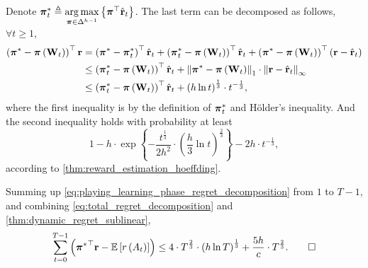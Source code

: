 Denote ${\boldsymbol{\pi}}_t^* \triangleq \operatorname*{arg\,max}\limits_{{\boldsymbol{\pi}} \in \Delta^{h-1}}{\left\{ {\boldsymbol{\pi}}^\top \hat{{\mathbf{r}}}_t\right\}}$. The last term can be decomposed as follows, $\forall t \ge 1$,
\begin{equation}
\label{eq:playing_learning_phase_regret_decomposition}
\begin{split}
    \left( {{\boldsymbol{\pi}}^*} - {\boldsymbol{\pi}}\left( {\mathbf{W}}_t \right) \right)^\top {\mathbf{r}} &= \left( {{\boldsymbol{\pi}}^*} - {{\boldsymbol{\pi}}_t^*} \right)^\top \hat{{\mathbf{r}}}_t + \left( {{\boldsymbol{\pi}}_t^*} - {\boldsymbol{\pi}}\left( {\mathbf{W}}_t \right) \right)^\top \hat{{\mathbf{r}}}_t + \left( {{\boldsymbol{\pi}}^*} - {\boldsymbol{\pi}}\left( {\mathbf{W}}_t \right) \right)^\top \left( {\mathbf{r}} - \hat{{\mathbf{r}}}_t \right) \\
    &\le \left( {{\boldsymbol{\pi}}_t^*} - {\boldsymbol{\pi}}\left( {\mathbf{W}}_t \right) \right)^\top \hat{{\mathbf{r}}}_t  + \left\| {\boldsymbol{\pi}}^* - {\boldsymbol{\pi}}\left( {\mathbf{W}}_t \right) \right\|_1 \cdot \left\| {\mathbf{r}} - \hat{{\mathbf{r}}}_t \right\|_\infty \\
    &\le \left( {{\boldsymbol{\pi}}_t^*} - {\boldsymbol{\pi}}\left( {\mathbf{W}}_t \right) \right)^\top \hat{{\mathbf{r}}}_t + \left( h \ln{t} \right)^\frac{1}{3}  \cdot t^{- \frac{1}{3}},
\end{split}
\end{equation}
where the first inequality is by the definition of ${\boldsymbol{\pi}}_t^*$ and  H{\"o}lder's inequality. And the second inequality holds with probability at least 
\begin{equation*}
    1 - h \cdot \exp\left\{ - \frac{t^{\frac{1}{3}}}{2 h^2} \cdot \left( \frac{h}{3} \ln{t} \right)^{\frac{2}{3}} \right\} - 2 h \cdot t^{- \frac{1}{3}},
\end{equation*}
according to \cref{thm:reward_estimation_hoeffding}. 

Summing up \cref{eq:playing_learning_phase_regret_decomposition} from $1$ to $T-1$, and
combining \cref{eq:total_regret_decomposition} and \cref{thm:dynamic_regret_sublinear},
\begin{equation*}
\begin{split}
    \sum\limits_{t=0}^{T-1}{ \left( {{\boldsymbol{\pi}}^*}^\top {\mathbf{r}} - {\mathbb{E}} \left[ r\left(A_t\right) \right] \right) } \le 4 \cdot T^{\frac{2}{3}} \cdot \left( h \ln{T} \right)^{\frac{1}{3}} + \frac{5 h}{c} \cdot  T^{\frac{2}{3}}. \qedhere
\end{split}
\end{equation*}

